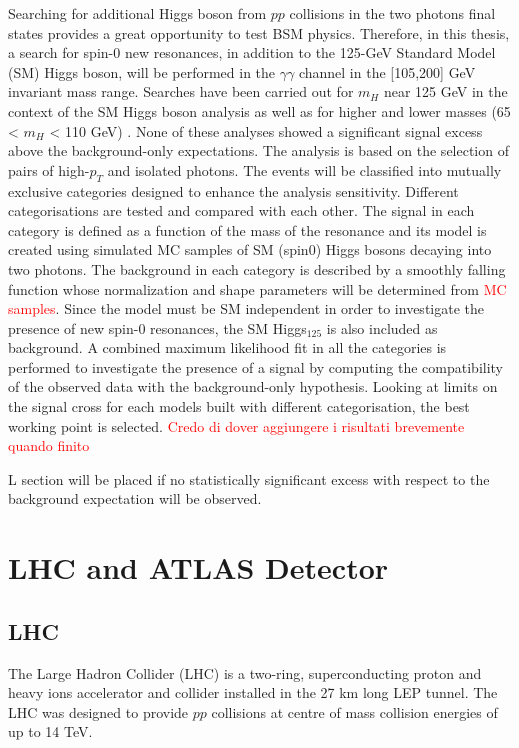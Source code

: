 \documentclass[a4paper, oneside, 11pt, openright]{book}
\begin{document}
		Searching for additional Higgs boson from $pp$ collisions in the two photons final states provides a great opportunity to test BSM physics. Therefore, in this thesis, a search for spin-0 new resonances, in addition to the 125-GeV Standard Model (SM) Higgs boson, will be performed in the $\gamma\gamma$ channel in the [105,200] GeV invariant mass range. Searches have been carried out for $m_H$ near 125 GeV in the context of the SM Higgs boson analysis \cite{Lanyov_2014} as well as for higher \cite{2021136651}\cite{2017105} and lower masses (65 < $m_H $ < 110 GeV) \cite{ATLAS-CONF-2018-025}. None of these analyses showed a significant signal excess above the background-only expectations.  The analysis is based on the selection of pairs of high-$p_T$ and isolated photons. The events will be classified into mutually exclusive categories designed to enhance the analysis sensitivity. Different categorisations are tested and compared with each other. The signal in each category is defined as a function of the mass of the resonance and its model is created using simulated MC samples of SM (spin0) Higgs bosons decaying into two photons. The background in each category is described by a smoothly falling function whose normalization and shape parameters will be determined from \textcolor{red}{MC samples}. Since the model must be SM independent in order to investigate the presence of new spin-0 resonances, the SM Higgs$_{125}$ is also included as background. A combined maximum likelihood fit in all the categories is performed to investigate the presence of a signal by computing the compatibility of the observed data with the background-only hypothesis. Looking at limits on the signal cross for each models built with different categorisation, the best working point is selected. \textcolor{red}{Credo di dover aggiungere i risultati brevemente quando finito}
		
		 L section will be placed if no statistically significant excess with respect to the background expectation will be observed.
		
	
	\chapter{LHC and ATLAS Detector}
		\section{LHC}
			The Large Hadron Collider (LHC) \cite{LHC_DESIGN_2008} is a two-ring, superconducting proton and heavy ions accelerator and collider installed in the 27 km long LEP \cite{LEP_DESIGN_2001} tunnel. The LHC was designed to provide $pp$ collisions at centre of mass collision energies of up to 14 TeV. 
			
\end{document}
